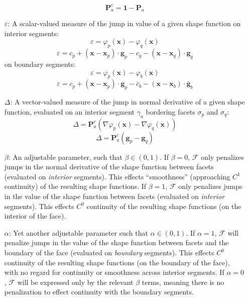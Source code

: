 \documentclass[11pt]{article} %
\begin{document}
\begin{itemize}
	\begin{equation}
		\mathbf{P}^c_a = \mathbf{1} - \mathbf{P}_a
	\end{equation}
	\item[$\varepsilon$:] A scalar-valued measure of the jump in value of a given shape function on interior segments:
	\begin{equation}
		\varepsilon = \varphi_p (\mathbf{x}) - \varphi_q (\mathbf{x})
	\end{equation}
	\begin{equation}
		\varepsilon = c_p + (\mathbf{x} - \mathbf{x}_p) \cdot \mathbf{g}_p - c_q - (\mathbf{x} - \mathbf{x}_q) \cdot \mathbf{g}_q
	\end{equation}
	on boundary segments:
	\begin{equation}
		\varepsilon = \varphi_p (\mathbf{x}) - \varphi_b (\mathbf{x})
	\end{equation}
	\begin{equation}
		\varepsilon = c_p + (\mathbf{x} - \mathbf{x}_p) \cdot \mathbf{g}_p - \bar{c}_b - (\mathbf{x} - \mathbf{x}_b) \cdot \bar{\mathbf{g}}_b
	\end{equation}
	\item[$\Delta$:] A vector-valued measure of the jump in normal derivative of a given shape function, evaluated on an interior segment $\gamma_a$ bordering facets $\sigma_p$ and $\sigma_q$:
	\begin{equation}
		\Delta =\mathbf{P}^c_a ( \nabla \varphi_p (\mathbf{x}) - \nabla \varphi_q (\mathbf{x}) )
	\end{equation}
	\begin{equation}
		\Delta =\mathbf{P}^c_a ( \mathbf{g}_p - \mathbf{g}_q )
	\end{equation}
	\item[$\beta$:] An adjustable parameter, such that $\beta \in (0, 1)$. If $\beta = 0$, $\mathcal{F}$ only penalizes jumps in the normal derivative of the shape function between facets (evaluated on \textit{interior} segments). This effects ``smoothness'' (approaching $C^1$ continuity) of the resulting shape functions. If $\beta = 1$, $\mathcal{F}$ only penalizes jumps in the value of the shape function between facets (evaluated on \textit{interior} segments). This effects $C^0$ continuity of the resulting shape functions (on the interior of the face).
	\item[$\alpha$:] Yet another adjustable parameter such that $\alpha \in (0, 1)$. If $\alpha = 1$, $\mathcal{F}$ will penalize jumps in the value of the shape function between facets and the boundary of the face (evaluated on \textit{boundary} segments). This effects $C^0$ continuity of the resulting shape functions (on the boundary of the face), with no regard for continuity or smoothness across interior segments. If $\alpha = 0$, $\mathcal{F}$ will be expressed only by the relevant $\beta$ terms, meaning there is no penalization to effect continuity with the boundary segments.

\end{itemize}
\end{document}

